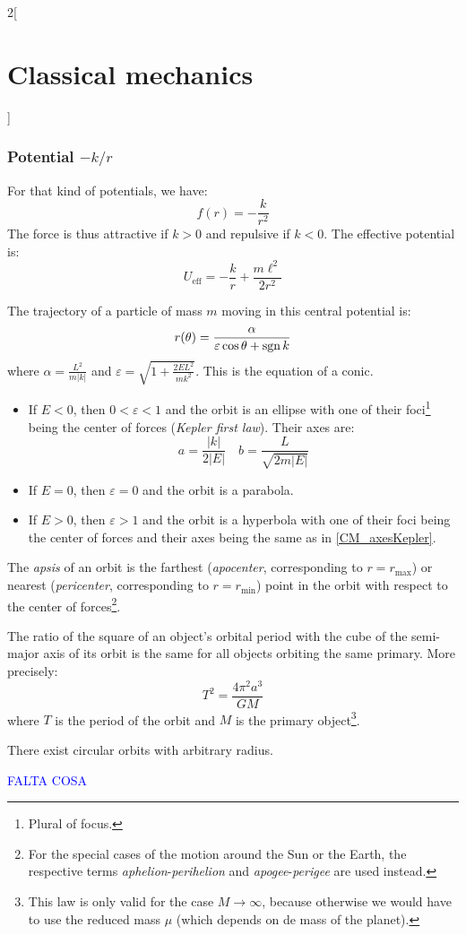 \documentclass[../../../main.tex]{subfiles}
\begin{document}
\begin{multicols}{2}[\section{Classical mechanics}]
  \subsubsection{Potential \texorpdfstring{$-k/r$}{-k/r}}
  \begin{proposition}
    For that kind of potentials, we have: $$f(r)=-\frac{k}{r^2}$$
    The force is thus attractive if $k>0$ and repulsive if $k<0$. The effective potential is: $$U_\text{eff}=-\frac{k}{r}+\frac{m\ell^2}{2r^2}$$
  \end{proposition}
  \begin{theorem}
    The trajectory of a particle of mass $m$ moving in this central potential is: $$r(\theta)=\frac{\alpha}{\varepsilon\cos\theta+\operatorname{sgn} k}$$ where $\displaystyle\alpha=\frac{L^2}{m|k|}$ and $\displaystyle\varepsilon=\sqrt{1+\frac{2EL^2}{mk^2}}$. This is the equation of a conic.
    \begin{itemize}
      \item If $E<0$, then $0<\varepsilon<1$ and the orbit is an ellipse with one of their foci\footnote{Plural of focus.} being the center of forces (\emph{Kepler first law}). Their axes are:
            \begin{equation}\label{CM_axesKepler}
              a=\frac{|k|}{2|E|}\quad b=\frac{L}{\sqrt{2m|E|}}
            \end{equation}
      \item If $E=0$, then $\varepsilon=0$ and the orbit is a parabola.
      \item If $E>0$, then $\varepsilon>1$ and the orbit is a hyperbola with one of their foci being the center of forces and their axes being the same as in \cref{CM_axesKepler}.
    \end{itemize}
  \end{theorem}
  \begin{definition}
    The \emph{apsis} of an orbit is the farthest (\emph{apocenter}, corresponding to $r=r_\text{max}$) or nearest (\emph{pericenter}, corresponding to $r=r_\text{min}$) point in the orbit with respect to the center of forces\footnote{For the special cases of the motion around the Sun or the Earth, the respective terms \emph{aphelion}-\emph{perihelion} and \emph{apogee}-\emph{perigee} are used instead.}.
  \end{definition}
  \begin{law}
    The ratio of the square of an object's orbital period with the cube of the semi-major axis of its orbit is the same for all objects orbiting the same primary. More precisely: $$T^2=\frac{4\pi^2a^3}{GM}$$ where $T$ is the period of the orbit and $M$ is the primary object\footnote{This law is only valid for the case $M\to\infty$, because otherwise we would have to use the reduced mass $\mu$ (which depends on de mass of the planet).}.
  \end{law}
  \begin{theorem}
    There exist circular orbits with arbitrary radius.
  \end{theorem}
  \textcolor{blue}{FALTA COSA}
\end{multicols}
\end{document}
